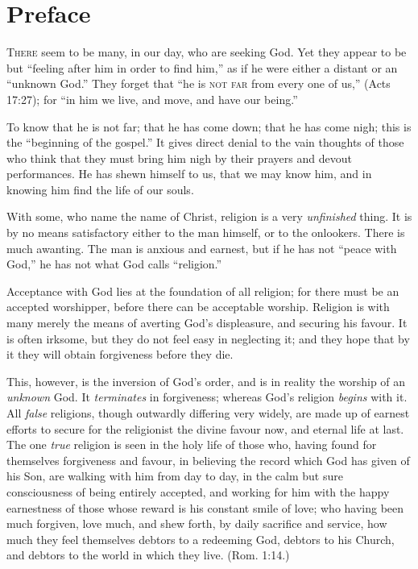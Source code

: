 \documentclass[
]{book}
\begin{document}
\clearpage
\setcounter{page}{1}

\hypertarget{preface}{%
\chapter*{Preface}\label{preface}}

\textsc{There} seem to be many, in our day, who are seeking God. Yet they appear to be but ``feeling after him in order to find him,'' as if he were either a distant or an ``unknown God.'' They forget that ``he is \textsc{not far} from every one of us,'' (Acts 17:27); for ``in him we live, and move, and have our being.''

To know that he is not far; that he has come down; that he has come nigh; this is the ``beginning of the gospel.'' It gives direct denial to the vain thoughts of those who think that they must bring him nigh by their prayers and devout performances. He has shewn himself to us, that we may know him, and in knowing him find the life of our souls.

With some, who name the name of Christ, religion is a very \emph{unfinished} thing. It is by no means satisfactory either to the man himself, or to the onlookers. There is much awanting. The man is anxious and earnest, but if he has not ``peace with God,'' he has not what God calls ``religion.''

Acceptance with God lies at the foundation of all religion; for there must be an accepted worshipper, before there can be acceptable worship. Religion is with many merely the means of averting God's displeasure, and securing his favour. It is often irksome, but they do not feel easy in neglecting it; and they hope that by it they will obtain forgiveness before they die.

This, however, is the inversion of God's order, and is in reality the worship of an \emph{unknown} God. It \emph{terminates} in forgiveness; whereas God's religion \emph{begins} with it. All \emph{false} religions, though outwardly differing very widely, are made up of earnest efforts to secure for the religionist the divine favour now, and eternal life at last. The one \emph{true} religion is seen in the holy life of those who, having found for themselves forgiveness and favour, in believing the record which God has given of his Son, are walking with him from day to day, in the calm but sure consciousness of being entirely accepted, and working for him with the happy earnestness of those whose reward is his constant smile of love; who having been much forgiven, love much, and shew forth, by daily sacrifice and service, how much they feel themselves debtors to a redeeming God, debtors to his Church, and debtors to the world in which they live. (Rom. 1:14.)
\end{document}

